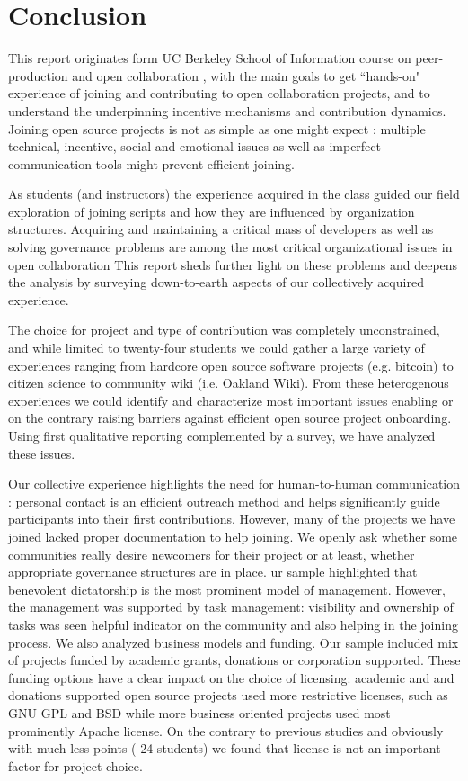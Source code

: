 \section{Conclusion}

This report originates form UC Berkeley School of Information course on peer-production and open collaboration \cite{classweb2013}, with the main goals to get ``hands-on" experience of joining and contributing to open collaboration projects, and to understand the underpinning incentive mechanisms and contribution dynamics. Joining open source projects is not as simple as one might expect : multiple technical, incentive, social and emotional issues as well as imperfect communication tools  might prevent efficient joining. 

As students (and instructors) the experience acquired in the class guided our field exploration of joining scripts and how they are influenced by organization structures. Acquiring and maintaining a critical mass of developers as well as solving governance problems are among the most critical organizational issues in open collaboration \cite{} This report sheds further light on these problems and deepens the analysis by surveying down-to-earth aspects of our collectively acquired experience.

The choice for project and type of contribution was completely unconstrained, and while limited to twenty-four students we could gather a large variety of experiences ranging from hardcore open source software projects (e.g. bitcoin) to citizen science to community wiki (i.e. Oakland Wiki). From these heterogenous experiences we could identify and characterize most important issues enabling or on the contrary raising barriers against efficient open source project onboarding. Using first qualitative reporting complemented by a survey, we have analyzed these issues.

Our collective experience highlights the need for human-to-human communication : personal contact is an efficient outreach method and helps significantly guide participants into their first contributions. However, many of the projects we have joined lacked proper documentation to help joining. We openly ask whether some communities really desire newcomers for their project or at least, whether appropriate governance structures are in place. ur sample highlighted that benevolent dictatorship is the most prominent model of management. However, the management was supported by task management: visibility and ownership of tasks was seen helpful indicator on the community and also helping in the joining process. We also analyzed business models and funding. Our sample included mix of projects funded by academic grants, donations or corporation supported. These funding options have a clear impact on the choice of licensing: academic and and donations supported open source projects used more restrictive licenses, such as GNU GPL and BSD while more business oriented projects used most prominently Apache license. On the contrary to previous studies \cite{belenzon2012} and obviously with much less points ( 24 students)  we found that license is not an important factor for project choice.

